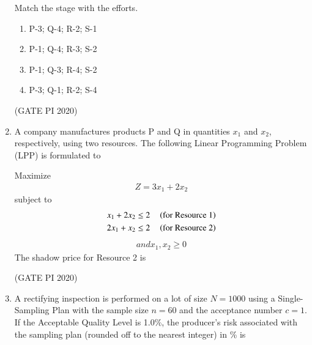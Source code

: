 \documentclass[journal,12pt,onecolumn]{IEEEtran}
\theoremstyle{remark}
\begin{document}
\begin{enumerate}


Match the stage with the efforts.
\begin{enumerate}
    \item P-3; Q-4; R-2; S-1
    \item P-1; Q-4; R-3; S-2
    \item P-1; Q-3; R-4; S-2
    \item P-3; Q-1; R-2; S-4
\end{enumerate}

\hfill (GATE PI 2020)

\item A company manufactures products P and Q in quantities $x_1$ and $x_2$, respectively, using two resources. The following Linear Programming Problem (LPP) is formulated to


Maximize 
\begin{align*}
Z = 3x_1 + 2x_2
\end{align*}
subject to 
\begin{align*}
x_1 + 2x_2 \leq 2 \quad \left(\text{for Resource 1}\right) \\
2x_1 + x_2 \leq 2 \quad \left(\text{for Resource 2}\right)
\end{align*}
\begin{align*}
and x_1, x_2 \geq 0
\end{align*}
The shadow price for Resource 2 is
\begin{enumerate}
\end{enumerate}

\hfill (GATE PI 2020)

\item A rectifying inspection is performed on a lot of size $N = 1000$ using a Single-Sampling Plan with the sample size $n = 60$ and the acceptance number $c = 1$. If the Acceptable Quality Level is 1.0\%, the producer's risk associated with the sampling plan (rounded off to the nearest integer) in \% is
\begin{enumerate}
\end{enumerate}


\end{enumerate}
\end{document}
